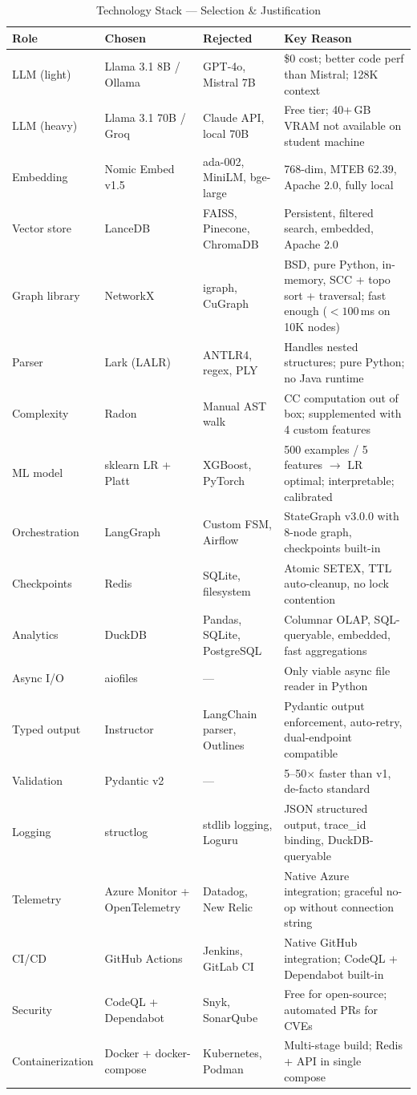 \documentclass[11pt,a4paper]{article}
\begin{document}
\begin{table}[H]
\centering
\caption{Technology Stack — Selection \& Justification}
\renewcommand{\arraystretch}{1.25}
\small
\begin{tabularx}{\textwidth}{@{} l l l X @{}}
\toprule
\textbf{Role} & \textbf{Chosen} & \textbf{Rejected} & \textbf{Key Reason} \\
\midrule
LLM (light) & Llama 3.1 8B / Ollama & GPT-4o, Mistral 7B & \$0 cost; better code perf than Mistral; 128K context \\
LLM (heavy) & Llama 3.1 70B / Groq & Claude API, local 70B & Free tier; 40+\,GB VRAM not available on student machine \\
Embedding & Nomic Embed v1.5 & ada-002, MiniLM, bge-large & 768-dim, MTEB 62.39, Apache 2.0, fully local \\
Vector store & LanceDB & FAISS, Pinecone, ChromaDB & Persistent, filtered search, embedded, Apache 2.0 \\
Graph library & NetworkX & igraph, CuGraph & BSD, pure Python, in-memory, SCC + topo sort + traversal; fast enough ($<100$\,ms on 10K nodes) \\
Parser & Lark (LALR) & ANTLR4, regex, PLY & Handles nested structures; pure Python; no Java runtime \\
Complexity & Radon & Manual AST walk & CC computation out of box; supplemented with 4 custom features \\
ML model & sklearn LR + Platt & XGBoost, PyTorch & 500 examples / 5 features $\to$ LR optimal; interpretable; calibrated \\
Orchestration & LangGraph & Custom FSM, Airflow & StateGraph v3.0.0 with 8-node graph, checkpoints built-in \\
Checkpoints & Redis & SQLite, filesystem & Atomic SETEX, TTL auto-cleanup, no lock contention \\
Analytics & DuckDB & Pandas, SQLite, PostgreSQL & Columnar OLAP, SQL-queryable, embedded, fast aggregations \\
Async I/O & aiofiles & — & Only viable async file reader in Python \\
Typed output & Instructor & LangChain parser, Outlines & Pydantic output enforcement, auto-retry, dual-endpoint compatible \\
Validation & Pydantic v2 & — & 5–50$\times$ faster than v1, de-facto standard \\
Logging & structlog & stdlib logging, Loguru & JSON structured output, trace\_id binding, DuckDB-queryable \\
Telemetry & Azure Monitor + OpenTelemetry & Datadog, New Relic & Native Azure integration; graceful no-op without connection string \\
CI/CD & GitHub Actions & Jenkins, GitLab CI & Native GitHub integration; CodeQL + Dependabot built-in \\
Security & CodeQL + Dependabot & Snyk, SonarQube & Free for open-source; automated PRs for CVEs \\
Containerization & Docker + docker-compose & Kubernetes, Podman & Multi-stage build; Redis + API in single compose \\
\bottomrule
\end{tabularx}
\end{table}
\end{document}

